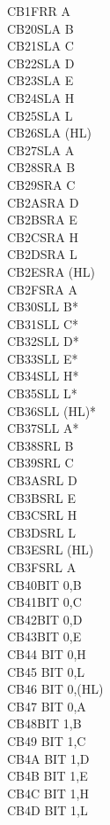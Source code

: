 \documentclass[oneside,a4paper]{book}
\begin{document}
\begin{multicols}{3}
{\begin{tabbing}
CB1F\>RR A\\
CB20\>SLA B\\
CB21\>SLA C\\
CB22\>SLA D\\
CB23\>SLA E\\
CB24\>SLA H\\
CB25\>SLA L\\
CB26\>SLA (HL)\\
CB27\>SLA A\\
CB28\>SRA B\\
CB29\>SRA C\\
CB2A\>SRA D\\
CB2B\>SRA E\\
CB2C\>SRA H\\
CB2D\>SRA L\\
CB2E\>SRA (HL)\\
CB2F\>SRA A\\
CB30\>SLL B*\\
CB31\>SLL C*\\
CB32\>SLL D*\\
CB33\>SLL E*\\
CB34\>SLL H*\\
CB35\>SLL L*\\
CB36\>SLL (HL)*\\
CB37\>SLL A*\\
CB38\>SRL B\\
CB39\>SRL C\\
CB3A\>SRL D\\
CB3B\>SRL E\\
CB3C\>SRL H\\
CB3D\>SRL L\\
CB3E\>SRL (HL)\\
CB3F\>SRL A\\
CB40\>BIT 0,B\\
CB41\>BIT 0,C\\
CB42\>BIT 0,D\\
CB43\>BIT 0,E\\
CB44\> 	BIT 0,H\\
CB45\> 	BIT 0,L\\
CB46\> 	BIT 0,(HL)\\
CB47\> 	BIT 0,A\\
CB48\>BIT 1,B\\
CB49\> 	BIT 1,C\\
CB4A\> 	BIT 1,D\\
CB4B\> 	BIT 1,E\\
CB4C\> 	BIT 1,H\\
CB4D\> 	BIT 1,L\\

\end{tabbing}}
\end{multicols}
\end{document}

